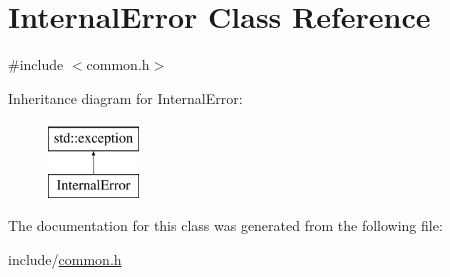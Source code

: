 \hypertarget{classInternalError}{}\section{Internal\+Error Class Reference}
\label{classInternalError}


{\ttfamily \#include $<$common.\+h$>$}

Inheritance diagram for Internal\+Error\+:\begin{figure}[H]
\begin{center}
\leavevmode
\includegraphics[height=2.000000cm]{classInternalError}
\end{center}
\end{figure}


The documentation for this class was generated from the following file\+:\begin{DoxyCompactItemize}
\item 
include/\hyperlink{common_8h}{common.\+h}\end{DoxyCompactItemize}
